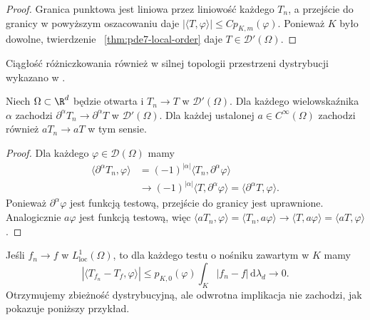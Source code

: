 \begin{proof}
Granica punktowa jest liniowa przez liniowość
każdego $T_n$, a przejście do granicy w powyższym
oszacowaniu daje
$|\langle T,\varphi\rangle|\le C p_{K,m}(\varphi)$.
Ponieważ $K$ było dowolne, twierdzenie
~\ref{thm:pde7-local-order} daje $T\in\mathcal D'(\Omega)$.
\end{proof}

Ciągłość różniczkowania również w silnej topologii przestrzeni dystrybucji wykazano w .

\begin{stwierdzenie}
\label{prop:pde7-derivative-limit}
Niech $\Omega\subset\R^d$ będzie otwarta i
$T_n\to T$ w $\mathcal D'(\Omega)$. Dla każdego
wielowskaźnika $\alpha$ zachodzi
$\partial^\alpha T_n\to\partial^\alpha T$ w $\mathcal D'(\Omega)$.
Dla każdej ustalonej $a\in C^\infty(\Omega)$ zachodzi
również $aT_n\to aT$ w tym sensie.
\end{stwierdzenie}
\begin{proof}
Dla każdego $\varphi\in\mathcal D(\Omega)$ mamy
\[
 \begin{aligned}
 \langle\partial^\alpha T_n,\varphi\rangle
 &=(-1)^{|\alpha|}\langle T_n,\partial^\alpha\varphi\rangle\\
 &\longrightarrow
 (-1)^{|\alpha|}\langle T,\partial^\alpha\varphi\rangle
 =\langle\partial^\alpha T,\varphi\rangle.
 \end{aligned}
\]
Ponieważ $\partial^\alpha\varphi$ jest funkcją testową,
przejście do granicy jest uprawnione.
Analogicznie $a\varphi$ jest funkcją testową, więc
$\langle aT_n,\varphi\rangle=\langle T_n,a\varphi\rangle
\to\langle T,a\varphi\rangle=\langle aT,\varphi\rangle$.
\end{proof}

Jeśli $f_n\to f$ w $L^1_{\mathrm{loc}}(\Omega)$,
to dla każdego testu o nośniku zawartym w $K$
mamy
\[
 |\langle T_{f_n}-T_f,\varphi\rangle|
 \le p_{K,0}(\varphi)
 \int_K|f_n-f|\,\mathrm d\lambda_d\longrightarrow0.
\]
Otrzymujemy zbieżność dystrybucyjną, ale odwrotna
implikacja nie zachodzi, jak pokazuje poniższy przykład.

